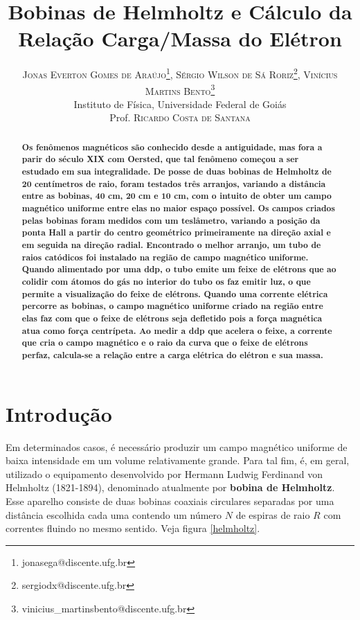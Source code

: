 \documentclass{article}
\title{\vspace{-18mm}\fontsize{16pt}{18pt}\selectfont\textbf{Bobinas de Helmholtz e Cálculo da Relação Carga/Massa do Elétron}}
\author{
\large
\textsc{Jonas Everton Gomes de Araújo\thanks{jonasega@discente.ufg.br }, Sérgio Wilson de Sá Roriz\thanks{sergiodx@discente.ufg.br}, Vinícius Martins Bento\thanks{vinicius\_martinsbento@discente.ufg.br}}\\[2mm]
\large Instituto de Física, Universidade Federal de Goiás \\
\large Prof. \textsc{Ricardo Costa de Santana}
}
\date{}
\begin{document}
\maketitle

\thispagestyle{fancy} 
 

\begin{abstract}
\textbf{Os fenômenos magnéticos são conhecido desde a antiguidade, mas fora a parir do século XIX com Oersted, que tal fenômeno começou a ser estudado em sua integralidade. De posse de duas bobinas de Helmholtz de 20 centímetros de raio, foram testados três arranjos, variando a distância entre as bobinas, 40 cm, 20 cm e 10 cm, com o intuito de obter um campo magnético uniforme entre elas no maior espaço possível. Os campos criados pelas bobinas foram medidos com um teslâmetro, variando a posição da ponta Hall a partir do centro geométrico primeiramente na direção axial e em seguida na direção radial. Encontrado o melhor arranjo, um tubo de raios catódicos foi instalado na região de campo magnético uniforme. Quando alimentado por uma ddp, o tubo emite um feixe de elétrons que ao colidir com átomos do gás no interior do tubo os faz emitir luz, o que permite  a visualização do feixe de elétrons. Quando uma corrente elétrica percorre as bobinas, o campo magnético uniforme criado na região entre elas faz com que o feixe de elétrons seja defletido pois a força magnética atua como força centrípeta. Ao medir a ddp que acelera o feixe, a corrente que cria o campo magnético e o raio da curva que o feixe de elétrons perfaz, calcula-se a relação entre a carga elétrica do elétron e sua massa.}
\end{abstract}
%
\vspace{0.5cm}

\setlength{\columnsep}{10pt}%
\section{Introdução}

Em determinados casos, é necessário produzir um campo magnético uniforme de baixa intensidade em um volume relativamente grande. Para tal fim, é, em geral, utilizado o equipamento desenvolvido por Hermann Ludwig Ferdinand von Helmholtz (1821-1894), denominado atualmente por \textbf{bobina de Helmholtz}. Esse aparelho consiste de duas bobinas coaxiais circulares separadas por uma distância escolhida cada uma contendo um número $N$ de espiras de raio $R$ com correntes fluindo no mesmo sentido. Veja figura \ref{helmholtz}.
\end{document}
